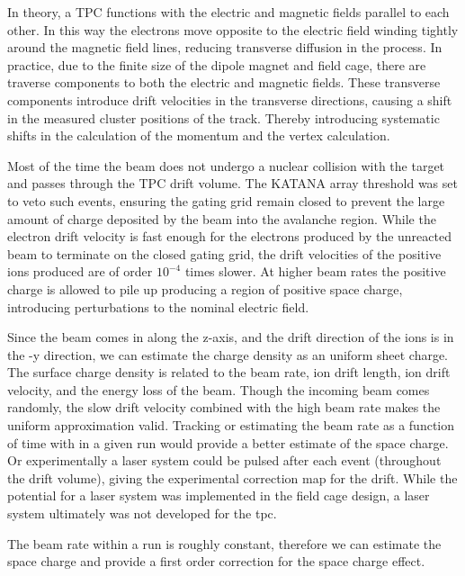 In theory, a TPC functions with the electric and magnetic fields parallel to each other. In this way the electrons move opposite to the electric field winding tightly around the magnetic field lines, reducing transverse diffusion in the process. In practice, due to the finite size of the dipole magnet and field cage, there are traverse components to both the electric and magnetic fields. These transverse components introduce drift velocities in the transverse directions, causing a shift in the measured cluster positions of the track. Thereby introducing systematic shifts in the calculation of the momentum and the vertex calculation. 

Most of the time the beam does not undergo a nuclear collision with the target and passes through the TPC drift volume. The KATANA array threshold was set to veto such events, ensuring the gating grid remain closed to prevent the large amount of charge deposited by the beam into the avalanche region. While the electron drift velocity is fast enough for the electrons produced by the unreacted beam to terminate on the closed gating grid, the drift velocities of the positive ions produced are of order $10^{-4}$ times slower. At higher beam rates the positive charge is allowed to pile up producing a region of positive space charge, introducing perturbations to the nominal electric field. 

Since the beam comes in along the z-axis, and the drift direction of the ions is in the -y direction, we can estimate the charge density as an uniform sheet charge. The surface charge density is related to the beam rate, ion drift length, ion drift velocity, and the energy loss of the beam. Though the incoming beam comes randomly, the slow drift velocity combined with the high beam rate makes the uniform approximation valid. Tracking or estimating the beam rate as a function of time with in a given run would provide a better estimate of the space charge. Or experimentally a laser system could be pulsed after each event (throughout the drift volume), giving the experimental correction map for the drift. While the potential for a laser system was implemented in the field cage design, a laser system ultimately was not developed for the \spirit tpc. 

The beam rate within a run is roughly constant, therefore we can estimate the space charge and provide a first order correction for the space charge effect. 

